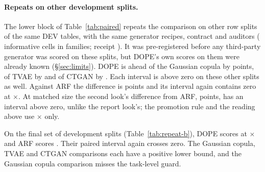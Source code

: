\paragraph{Repeats on other development splits.}
The lower block of Table~\ref{tab:paired} repeats the comparison on other row splits of the same DEV tables, with the same generator recipes, contract and auditors ( informative cells in  families; receipt \texttt{}).
It was pre-registered before any third-party generator was scored on these splits, but DOPE's own scores on them were already known (\S\ref{sec:limits}).
DOPE is ahead of the Gaussian copula by  points, of TVAE by  and of CTGAN by . Each interval is above zero on these other splits as well.
Against ARF the difference is  points and its interval again contains zero at $\times$.
At matched size the second look's difference from ARF,  points, has an interval above zero, unlike the report look's; the promotion rule and the reading above use $\times$ only.

On the final set of development splits (Table~\ref{tab:repeat-b}), DOPE scores  at $\times$ and ARF scores . Their paired interval again crosses zero. The Gaussian copula, TVAE and CTGAN comparisons each have a positive lower bound, and the Gaussian copula comparison misses the task-level guard.
